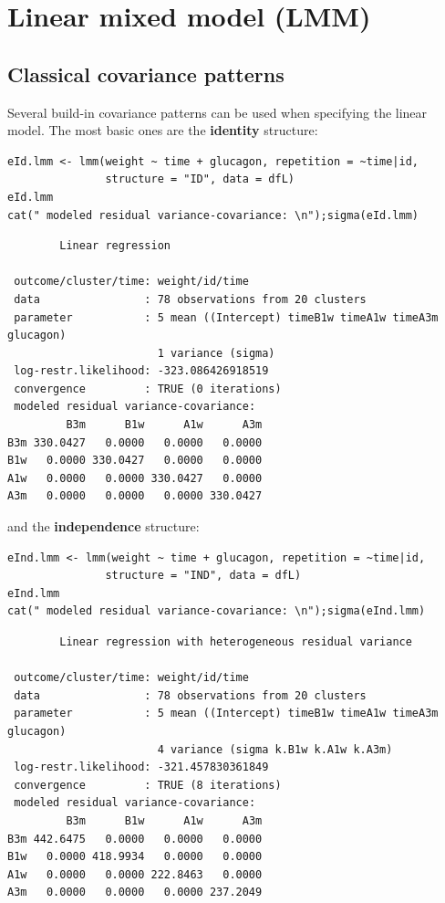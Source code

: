 \documentclass[12pt]{article}
\begin{document}
\clearpage

\section{Linear mixed model (LMM)}
\label{sec:org85ec94e}
\subsection{Classical covariance patterns}
\label{sec:org803e9f6}

Several build-in covariance patterns can be used when specifying the
linear model. The most basic ones are the \textbf{identity} structure:
\lstset{language=r,label= ,caption= ,captionpos=b,numbers=none}
\begin{lstlisting}
eId.lmm <- lmm(weight ~ time + glucagon, repetition = ~time|id, 
               structure = "ID", data = dfL)
eId.lmm
cat(" modeled residual variance-covariance: \n");sigma(eId.lmm)
\end{lstlisting}

\begin{verbatim}
		Linear regression 

 outcome/cluster/time: weight/id/time 
 data                : 78 observations from 20 clusters 
 parameter           : 5 mean ((Intercept) timeB1w timeA1w timeA3m glucagon) 
                       1 variance (sigma) 
 log-restr.likelihood: -323.086426918519 
 convergence         : TRUE (0 iterations)
 modeled residual variance-covariance: 
         B3m      B1w      A1w      A3m
B3m 330.0427   0.0000   0.0000   0.0000
B1w   0.0000 330.0427   0.0000   0.0000
A1w   0.0000   0.0000 330.0427   0.0000
A3m   0.0000   0.0000   0.0000 330.0427
\end{verbatim}

and the \textbf{independence} structure:
\lstset{language=r,label= ,caption= ,captionpos=b,numbers=none}
\begin{lstlisting}
eInd.lmm <- lmm(weight ~ time + glucagon, repetition = ~time|id, 
               structure = "IND", data = dfL)
eInd.lmm
cat(" modeled residual variance-covariance: \n");sigma(eInd.lmm)
\end{lstlisting}

\begin{verbatim}
		Linear regression with heterogeneous residual variance 

 outcome/cluster/time: weight/id/time 
 data                : 78 observations from 20 clusters 
 parameter           : 5 mean ((Intercept) timeB1w timeA1w timeA3m glucagon) 
                       4 variance (sigma k.B1w k.A1w k.A3m) 
 log-restr.likelihood: -321.457830361849 
 convergence         : TRUE (8 iterations)
 modeled residual variance-covariance: 
         B3m      B1w      A1w      A3m
B3m 442.6475   0.0000   0.0000   0.0000
B1w   0.0000 418.9934   0.0000   0.0000
A1w   0.0000   0.0000 222.8463   0.0000
A3m   0.0000   0.0000   0.0000 237.2049
\end{verbatim}
\end{document}
